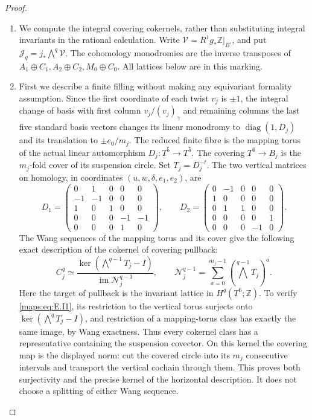 \begin{proof}
\begin{enumerate}[label=\arabic*.,leftmargin=*]
\item We compute the integral covering cokernels, rather than substituting
integral invariants in the rational calculation. Write
\(\mathcal V=R^1g_*\mathbb Z|_{B^\circ}\), and put
\(\mathcal J_q=j_*\bigwedge^q\mathcal V\).
The cohomology monodromies are the inverse transposes of
\(A_1\oplus C_1,A_2\oplus C_2,M_0\oplus C_0\).
All lattices below are in this marking.

\item First we describe a finite filling without making any equivariant
formality assumption. Since the first coordinate of each twist
\(v_j\) is \(\pm1\), the integral change of basis with first
column \(v_j/(v_j)_\gamma\) and remaining columns the last five
standard basis vectors changes its linear monodromy to
\(\operatorname{diag}(1,D_j)\) and its translation to
\(\pm e_0/m_j\). The reduced finite fibre is the mapping torus
of the actual linear automorphism \(D_j:T^5\to T^5\).
The covering \(T^6\to B_j\) is the \(m_j\)-fold cover of its
suspension circle. Set \(T_j=D_j^{-t}\). The two vertical matrices
on homology, in coordinates \((u,w,\delta,e_1,e_2)\), are
\[
D_1=\begin{pmatrix}
0&1&0&0&0\\-1&-1&0&0&0\\1&0&1&0&0\\
0&0&0&-1&-1\\0&0&0&1&0
\end{pmatrix},\qquad
D_2=\begin{pmatrix}
0&-1&0&0&0\\1&0&0&0&0\\0&1&1&0&0\\
0&0&0&0&1\\0&0&0&-1&0
\end{pmatrix}.
\]
The Wang sequences of the mapping torus and its cover give the
following exact description of the cokernel of covering pullback:
\[
 C_j^q\simeq
 \frac{\ker(\bigwedge^{q-1}T_j-I)}
 {\operatorname{im}\mathcal N_j^{q-1}},\qquad
 \mathcal N_j^{q-1}=\sum_{a=0}^{m_j-1}
                  (\bigwedge^{q-1}T_j)^a .
 \tag{E.I1}\label{maps:eq:E.I1}
\]
Here the target of pullback is the invariant lattice in
\(H^q(T^6;\mathbb Z)\). To verify \eqref{maps:eq:E.I1}, its restriction to
the vertical torus surjects onto
\(\ker(\bigwedge^qT_j-I)\), and restriction of a mapping-torus
class has exactly the same image, by Wang exactness. Thus every
cokernel class has a representative containing the suspension
covector. On this kernel the covering map is the displayed norm:
cut the covered circle into its \(m_j\) consecutive intervals
and transport the vertical cochain through them. This proves both
surjectivity and the precise kernel of the horizontal description.
It does not choose a splitting of either Wang sequence.


\end{enumerate}
\end{proof}
